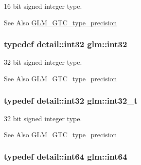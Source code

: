 16 bit signed integer type. 

\begin{DoxySeeAlso}{See Also}
\hyperlink{group__gtc__type__precision}{G\-L\-M\-\_\-\-G\-T\-C\-\_\-type\-\_\-precision} 
\end{DoxySeeAlso}
\hypertarget{group__gtc__type__precision_ga632d8b25f6b61659f39ea4321fab92a4}{
\subsubsection[{int32}]{\setlength{\rightskip}{0pt plus 5cm}typedef detail\-::int32 {\bf glm\-::int32}}}\label{group__gtc__type__precision_ga632d8b25f6b61659f39ea4321fab92a4}


32 bit signed integer type. 

\begin{DoxySeeAlso}{See Also}
\hyperlink{group__gtc__type__precision}{G\-L\-M\-\_\-\-G\-T\-C\-\_\-type\-\_\-precision} 
\end{DoxySeeAlso}
\hypertarget{group__gtc__type__precision_gab870c0eb6f525b0c8c4716762e0fc3a8}{
\subsubsection[{int32\-\_\-t}]{\setlength{\rightskip}{0pt plus 5cm}typedef detail\-::int32 {\bf glm\-::int32\-\_\-t}}}\label{group__gtc__type__precision_gab870c0eb6f525b0c8c4716762e0fc3a8}


32 bit signed integer type. 

\begin{DoxySeeAlso}{See Also}
\hyperlink{group__gtc__type__precision}{G\-L\-M\-\_\-\-G\-T\-C\-\_\-type\-\_\-precision} 
\end{DoxySeeAlso}
\hypertarget{group__gtc__type__precision_ga435d75819cce297cc5fa21bd84ef89a5}{
\subsubsection[{int64}]{\setlength{\rightskip}{0pt plus 5cm}typedef detail\-::int64 {\bf glm\-::int64}}}\label{group__gtc__type__precision_ga435d75819cce297cc5fa21bd84ef89a5}


